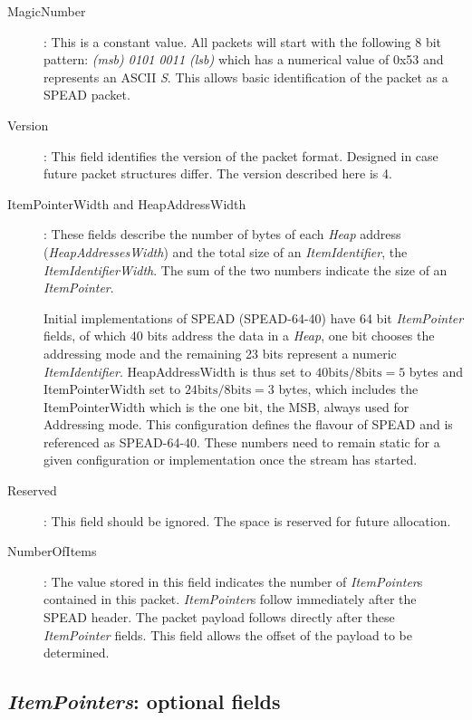 \documentclass[11pt,english,twoside]{article}
\begin{document}
\begin{description}

\item[MagicNumber]:
This is a constant value. All packets will start with the following 8 bit pattern: \emph{(msb) 0101 0011 (lsb)} which has a numerical value of
0x53 and represents an ASCII \emph{S}.  This allows basic identification of the packet as a SPEAD packet.

\item[Version]:
This field identifies the version of the packet format. Designed in case future packet structures differ. The version described here is 4.

\item[ItemPointerWidth and HeapAddressWidth]:
These fields describe the number of bytes of each \emph{Heap} address (\emph{HeapAddressesWidth}) and the total size of an
\emph{ItemIdentifier}, the \emph{ItemIdentifierWidth}. The sum of the two numbers indicate the size of an \emph{ItemPointer}.

Initial implementations of SPEAD (SPEAD-64-40) have 64 bit \emph{ItemPointer} fields, of which 40 bits address the data in a \emph{Heap}, one
bit chooses the addressing mode and the remaining 23 bits represent a numeric \emph{ItemIdentifier}.  HeapAddressWidth is thus set to $40
\mbox{bits} /8 \mbox{bits} =5$ bytes and ItemPointerWidth set to $24 \mbox{bits} /8 \mbox{bits} =3$ bytes, which includes the ItemPointerWidth
which is the one bit, the MSB, always used for Addressing mode. This configuration defines the flavour of SPEAD and is referenced as
SPEAD-64-40.  These numbers need to remain static for a given configuration or implementation once the stream has started.

\item[Reserved]:
This field should be ignored. The space is reserved for future allocation.

\item[NumberOfItems]:
The value stored in this field indicates the number of \emph{ItemPointer}s contained in this packet. \emph{ItemPointer}s follow immediately
after the SPEAD header. The packet payload follows directly after these \emph{ItemPointer} fields. This field allows the offset of the payload
to be determined.

\end{description}


\subsection{\emph{ItemPointers}: optional fields}
\end{document}
